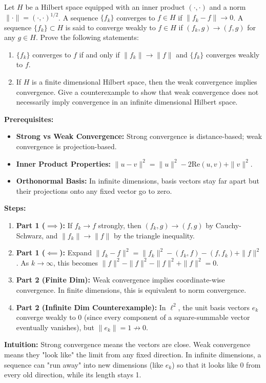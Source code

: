 \begin{exercise}
\label{analysis:2017:2}
Let $H$ be a Hilbert space equipped with an inner product $(\cdot,\cdot)$ and a norm $\|\cdot\| = (\cdot,\cdot)^{1/2}$. A sequence $\{f_k\}$ converges to $f \in H$ if $\|f_k-f\| \to 0$. A sequence $\{f_k\} \subset H$ is said to converge weakly to $f \in H$ if $(f_k,g) \to (f,g)$ for any $g \in H$. Prove the following statements:
\begin{enumerate}
    \item $\{f_k\}$ converges to $f$ if and only if $\|f_k\| \to \|f\|$ and $\{f_k\}$ converges weakly to $f$.
    \item If $H$ is a finite dimensional Hilbert space, then the weak convergence implies convergence. Give a counterexample to show that weak convergence does not necessarily imply convergence in an infinite dimensional Hilbert space.
\end{enumerate}
\end{exercise}

\begin{solution}
\textbf{Prerequisites:}
\begin{itemize}
    \item \textbf{Strong vs Weak Convergence:} Strong convergence is distance-based; weak convergence is projection-based.
    \item \textbf{Inner Product Properties:} $\|u-v\|^2 = \|u\|^2 - 2\text{Re}(u, v) + \|v\|^2$.
    \item \textbf{Orthonormal Basis:} In infinite dimensions, basis vectors stay far apart but their projections onto any fixed vector go to zero.
\end{itemize}

\textbf{Steps:}
\begin{enumerate}
    \item \textbf{Part 1 ($\implies$):} If $f_k \to f$ strongly, then $(f_k, g) \to (f, g)$ by Cauchy-Schwarz, and $\|f_k\| \to \|f\|$ by the triangle inequality.
    \item \textbf{Part 1 ($\impliedby$):} Expand $\|f_k - f\|^2 = \|f_k\|^2 - (f_k, f) - (f, f_k) + \|f\|^2$. As $k \to \infty$, this becomes $\|f\|^2 - \|f\|^2 - \|f\|^2 + \|f\|^2 = 0$.
    \item \textbf{Part 2 (Finite Dim):} Weak convergence implies coordinate-wise convergence. In finite dimensions, this is equivalent to norm convergence.
    \item \textbf{Part 2 (Infinite Dim Counterexample):} In $\ell^2$, the unit basis vectors $e_k$ converge weakly to 0 (since every component of a square-summable vector eventually vanishes), but $\|e_k\| = 1 \not\to 0$.
\end{enumerate}

\textbf{Intuition:}
Strong convergence means the vectors are close. Weak convergence means they "look like" the limit from any fixed direction. In infinite dimensions, a sequence can "run away" into new dimensions (like $e_k$) so that it looks like 0 from every old direction, while its length stays 1.
\end{solution}

